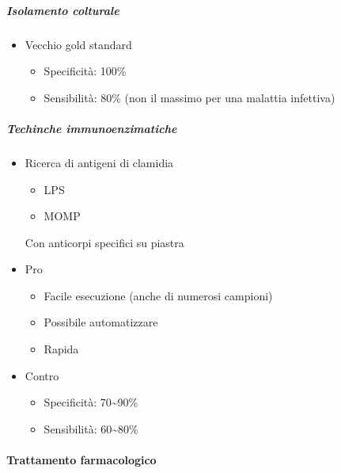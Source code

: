 \documentclass[italian,]{article}
\providecommand{\tightlist}{%
  \setlength{\itemsep}{0pt}\setlength{\parskip}{0pt}}
\begin{document}
\hypertarget{isolamento-colturale}{%
\subparagraph{Isolamento colturale}\label{isolamento-colturale}}

\begin{itemize}
\tightlist
\item
  Vecchio gold standard

  \begin{itemize}
  \tightlist
  \item
    Specificità: 100\%
  \item
    Sensibilità: 80\% (non il massimo per una malattia infettiva)
  \end{itemize}
\end{itemize}

\hypertarget{techinche-immunoenzimatiche}{%
\subparagraph{Techinche
immunoenzimatiche}\label{techinche-immunoenzimatiche}}

\begin{itemize}
\tightlist
\item
  Ricerca di antigeni di clamidia

  \begin{itemize}
  \tightlist
  \item
    LPS
  \item
    MOMP
  \end{itemize}

  Con anticorpi specifici su piastra
\item
  Pro

  \begin{itemize}
  \tightlist
  \item
    Facile esecuzione (anche di numerosi campioni)
  \item
    Possibile automatizzare
  \item
    Rapida
  \end{itemize}
\item
  Contro

  \begin{itemize}
  \tightlist
  \item
    Specificità: 70\textasciitilde{}90\%
  \item
    Sensibilità: 60\textasciitilde{}80\%
  \end{itemize}
\end{itemize}

\hypertarget{trattamento-farmacologico}{%
\paragraph{Trattamento farmacologico}\label{trattamento-farmacologico}}
\end{document}
